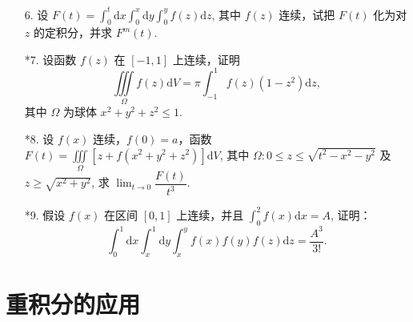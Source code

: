 \begin{enumerate}
    \item[6.] 设 $\displaystyle F(t)=\int_{0}^{t}\text{d}x\int_0^{x}\text{d}y\int_0^{y}f(z)\text{d}z$, 其中 $f(z)$ 连续，试把 $F(t)$ 化为对 $z$ 的定积分，并求 $F^{m}(t)$.
    
    \item[*7.] 设函数 $f(z)$ 在 $[-1, 1]$ 上连续，证明
    \[
        \iiint\limits_{\Omega}f(z)\text{d}V=\pi\int_{-1}^{1}f(z)(1-z^2)\text{d}z,
    \]
    其中 $\Omega$ 为球体 $x^2+y^2+z^2\leqslant 1$.

    \item[*8.] 设 $f(x)$ 连续，$f(0)=a$，函数 $F(t)=\displaystyle\iiint\limits_{\Omega}[z+f(x^2+y^2+z^2)]\text{d}V$, 其中 $\Omega : 0\leqslant z\leqslant \sqrt{t^2-x^2-y^2}$ 及 $z\geqslant \sqrt{x^2+y^2}$, 求 $\displaystyle\lim_{t\to0}\dfrac{F(t)}{t^3}$.
    
    \item[*9.] 假设 $f(x)$ 在区间 $[0, 1]$ 上连续，并且 $\displaystyle\int_0^2f(x)\text{d}x=A$, 证明：
    \[
        \int_0^1\text{d}x\int_x^1\text{d}y\int_x^yf(x)f(y)f(z)\text{d}z=\dfrac{A^3}{3!}.
    \]
\end{enumerate}


\section{重积分的应用}

